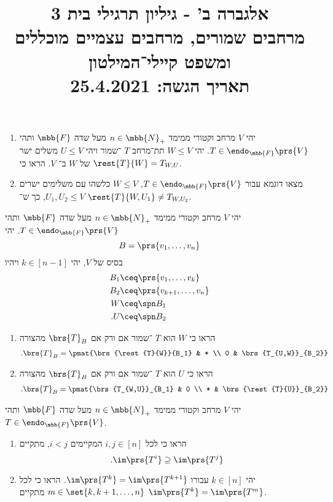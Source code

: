 \documentclass[a4paper,10pt,twoside,openany]{article}
\title{
אלגברה ב' - גיליון תרגילי בית 3 \\
מרחבים שמורים, מרחבים עצמיים מוכללים ומשפט קיילי־המילטון
\\
\small{תאריך הגשה: 25.4.2021} %
}
\date{}
\begin{document}
\maketitle

\begin{exercise}%
\begin{enumerate}
\item
יהי
$V$
מרחב וקטורי ממימד
$n \in \mbb{N}_+$
מעל שדה
$\mbb{F}$
ותהי
$T \in \endo_{\mbb{F}}\prs{V}$.
יהי
$W \leq V$
תת־מרחב
$T$%
־שמור ויהי
$U \leq V$
משלים ישר של
$W$
ב־%
$V$.
הראו כי
$\rest{T}{W} = T_{W,U}$.
\item
מצאו דוגמא עבור
$T \in \endo_{\mbb{F}}\prs{V}$,
$W \leq V$
כלשהו עם משלימים ישרים
$U_1, U_2 \leq V$,
כך ש־%
$\rest{T}{W, U_1} \neq T_{W,U_2}$.
\end{enumerate}
\end{exercise}

\begin{exercise}%
יהי
$V$
מרחב וקטורי ממימד
$n \in \mbb{N}_+$
מעל שדה
$\mbb{F}$
ותהי
$T \in \endo_{\mbb{F}}\prs{V}$.
יהי
\[B = \prs{v_1, \ldots, v_n}\]
בסיס של
$V$,
יהי
$k \in [n-1]$
ויהיו
\begin{align*}
B_1 &\ceq \prs{v_1, \ldots, v_k} \\
B_2 &\ceq \prs{v_{k+1}, \ldots, v_n} \\
W &\ceq \spn B_1 \\
\text{.} U &\ceq \spn B_2
\end{align*}

\begin{enumerate}
\item הראו כי
$W$
הוא
$T$%
־שמור אם ורק אם
$\brs{T}_B$
מהצורה
\begin{align*}
\text{.} \brs{T}_B = \pmat{\brs{\rest{T}{W}}{B_1} & * \\ 0 & \brs{T_{U,W}}_{B_2}}
\end{align*}
\item הראו כי
$U$
הוא
$T$%
־שמור אם ורק אם
$\brs{T}_B$
מהצורה
\begin{align*}
\text{.} \brs{T}_B = \pmat{\brs{T_{W,U}}_{B_1} & 0 \\ * & \brs{\rest{T}{U}}_{B_2}}
\end{align*}
\end{enumerate}

\end{exercise}

\begin{exercise}%
יהי
$V$
מרחב וקטורי ממימד
$n \in \mbb{N}_+$
מעל שדה
$\mbb{F}$
ותהי
$T \in \endo_{\mbb{F}}\prs{V}$.

\begin{enumerate}
\item הראו כי לכל
$i,j \in [n]$
המקיימים
$i < j$,
מתקיים
\[\text{.} \im\prs{T^i} \supseteq \im\prs{T^j}\]
\item יהי
$k \in [n]$
עבורו
$\im\prs{T^k} = \im\prs{T^{k+1}}$.
הראו כי לכל
$m \in \set{k, k+1, \ldots, n}$
מתקיים
$\im\prs{T^k} = \im\prs{T^m}$.
\end{enumerate}
\end{exercise}
\end{document}
